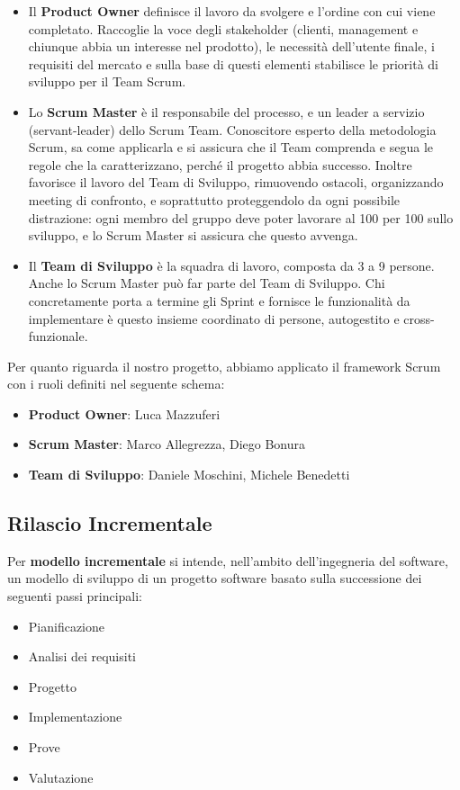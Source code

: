 \begin{itemize}
\item Il \textbf{Product Owner} definisce il lavoro da svolgere e l'ordine con cui viene completato. Raccoglie la voce degli stakeholder (clienti, management e chiunque abbia un interesse nel prodotto), le necessità dell'utente finale, i requisiti del mercato e sulla base di questi elementi stabilisce le priorità di sviluppo per il Team Scrum.
\item Lo \textbf{Scrum Master} è il responsabile del processo, e un leader a servizio (servant-leader) dello Scrum Team. Conoscitore esperto della metodologia Scrum, sa come applicarla e si assicura che il Team comprenda e segua le regole che la caratterizzano, perché il progetto abbia successo. Inoltre favorisce il lavoro del Team di Sviluppo, rimuovendo ostacoli, organizzando meeting di confronto, e soprattutto proteggendolo da ogni possibile distrazione: ogni membro del gruppo deve poter lavorare al 100 per 100 sullo sviluppo, e lo Scrum Master si assicura che questo avvenga.
\item Il \textbf{Team di Sviluppo} è la squadra di lavoro, composta da 3 a 9 persone. Anche lo Scrum Master può far parte del Team di Sviluppo. Chi concretamente porta a termine gli Sprint e fornisce le funzionalità da implementare è questo insieme coordinato di persone, autogestito e cross-funzionale.
\end{itemize}

Per quanto riguarda il nostro progetto, abbiamo applicato il framework Scrum con i ruoli definiti nel seguente schema:
\begin{itemize}
\item \textbf{Product Owner}: Luca Mazzuferi
\item \textbf{Scrum Master}: Marco Allegrezza, Diego Bonura
\item \textbf{Team di Sviluppo}: Daniele Moschini, Michele Benedetti
\end{itemize}

\newpage
\subsection{Rilascio Incrementale}

Per \textbf{modello incrementale}\cite{rin} si intende, nell'ambito dell'ingegneria del software, un modello di sviluppo di un progetto software basato sulla successione dei seguenti passi principali:

\begin{itemize}
\item Pianificazione
\item Analisi dei requisiti
\item Progetto
\item Implementazione
\item Prove
\item Valutazione
\end{itemize}

